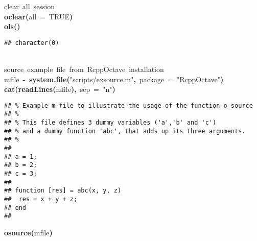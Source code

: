 \documentclass[english,10pt,a4paper]{article}\usepackage{graphicx, color}
\makeatletter
\newcommand{\hlnumber}[1]{\textcolor[rgb]{0,0,0}{#1}}%
\newcommand{\hlfunctioncall}[1]{\textcolor[rgb]{0.501960784313725,0,0.329411764705882}{\textbf{#1}}}%
\newcommand{\hlstring}[1]{\textcolor[rgb]{0.6,0.6,1}{#1}}%
\newcommand{\hlkeyword}[1]{\textcolor[rgb]{0,0,0}{\textbf{#1}}}%
\newcommand{\hlargument}[1]{\textcolor[rgb]{0.690196078431373,0.250980392156863,0.0196078431372549}{#1}}%
\newcommand{\hlcomment}[1]{\textcolor[rgb]{0.180392156862745,0.6,0.341176470588235}{#1}}%
\newcommand{\hlassignement}[1]{\textcolor[rgb]{0,0,0}{\textbf{#1}}}%
\newcommand{\hlsymbol}[1]{\textcolor[rgb]{0,0,0}{#1}}%
\newcommand{\hlstd}[1]{\textcolor[rgb]{0,0,0}{#1}}%
\newenvironment{kframe}{%
 \def\FrameCommand##1{\hskip\@totalleftmargin \hskip-\fboxsep
 \colorbox{shadecolor}{##1}\hskip-\fboxsep
     \hskip-\linewidth \hskip-\@totalleftmargin \hskip\columnwidth}%
 \MakeFramed {\advance\hsize-\width
   \@totalleftmargin\z@ \linewidth\hsize
   \@setminipage}}%
 {\par\unskip\endMakeFramed}
\newenvironment{knitrout}{}{} %
\makeatother
\begin{document}
\begin{knitrout}
\color{fgcolor}\begin{kframe}
\begin{flushleft}
\ttfamily\noindent
\hlcomment{\usebox{\hlnormalsizeboxhash}{\ }clear{\ }all{\ }session}\hspace*{\fill}\\
\hlstd{}\hlfunctioncall{o\usebox{\hlnormalsizeboxunderscore}clear}\hlkeyword{(}\hlargument{all}{\ }\hlargument{=}{\ }\hlnumber{TRUE}\hlkeyword{)}\hspace*{\fill}\\
\hlstd{}\hlfunctioncall{o\usebox{\hlnormalsizeboxunderscore}ls}\hlkeyword{(}\hlkeyword{)}\mbox{}
\normalfont
\end{flushleft}
\begin{verbatim}
## character(0)
\end{verbatim}
\begin{flushleft}
\ttfamily\noindent
\hspace*{\fill}\\
\hlstd{}\hlcomment{\usebox{\hlnormalsizeboxhash}{\ }source{\ }example{\ }file{\ }from{\ }RcppOctave{\ }installation}\hspace*{\fill}\\
\hlstd{}\hlsymbol{mfile}{\ }\hlassignement{\usebox{\hlnormalsizeboxlessthan}-}{\ }\hlfunctioncall{system.file}\hlkeyword{(}\hlstring{"{}scripts/ex\usebox{\hlnormalsizeboxunderscore}source.m"{}}\hlkeyword{,}{\ }\hlargument{package}{\ }\hlargument{=}{\ }\hlstring{"{}RcppOctave"{}}\hlkeyword{)}\hspace*{\fill}\\
\hlstd{}\hlfunctioncall{cat}\hlkeyword{(}\hlfunctioncall{readLines}\hlkeyword{(}\hlsymbol{mfile}\hlkeyword{)}\hlkeyword{,}{\ }\hlargument{sep}{\ }\hlargument{=}{\ }\hlstring{"{}\usebox{\hlnormalsizeboxbackslash}n"{}}\hlkeyword{)}\mbox{}
\normalfont
\end{flushleft}
\begin{verbatim}
## % Example m-file to illustrate the usage of the function o_source
## %
## % This file defines 3 dummy variables ('a','b' and 'c') 
## % and a dummy function 'abc', that adds up its three arguments.
## % 
## 
## a = 1;
## b = 2;
## c = 3;
## 
## function [res] = abc(x, y, z)
## 	res = x + y + z; 
## end
## 
\end{verbatim}
\begin{flushleft}
\ttfamily\noindent
\hlfunctioncall{o\usebox{\hlnormalsizeboxunderscore}source}\hlkeyword{(}\hlsymbol{mfile}\hlkeyword{)}\hspace*{\fill}\\

\end{flushleft}
\end{kframe}
\end{knitrout}
\end{document}
